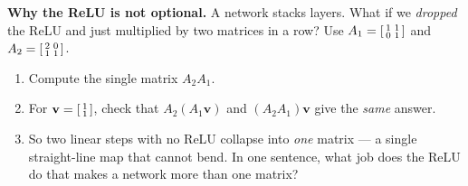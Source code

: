 \documentclass[10pt]{article}
\newcommand{\vv}{\mathbf{v}}
\begin{document}
\begin{tcolorbox}[colback=white, colframe=black!40, title=\textbf{Tier E --- Extension},
    fonttitle=\bfseries, arc=1.5mm, left=3mm, right=3mm, top=2mm, bottom=2mm, breakable]
\textbf{Why the ReLU is not optional.} A network stacks layers. What if we \emph{dropped} the ReLU and
just multiplied by two matrices in a row? Use $A_1=\begin{bsmallmatrix} 1 & 1\\ 0 & 1 \end{bsmallmatrix}$
and $A_2=\begin{bsmallmatrix} 2 & 0\\ 1 & 1 \end{bsmallmatrix}$.
\begin{enumerate}[leftmargin=1.7em, itemsep=9pt]
  \item Compute the single matrix $A_2A_1$. 
  \item For $\vv=\begin{bsmallmatrix} 1\\ 1 \end{bsmallmatrix}$, check that $A_2(A_1\vv)$ and $(A_2A_1)\vv$
        give the \emph{same} answer. \writeline
  \item So two linear steps with no ReLU collapse into \emph{one} matrix --- a single straight-line map
        that cannot bend. In one sentence, what job does the ReLU do that makes a network more than one
        matrix? \writeline
\end{enumerate}
\end{tcolorbox}
\end{document}
